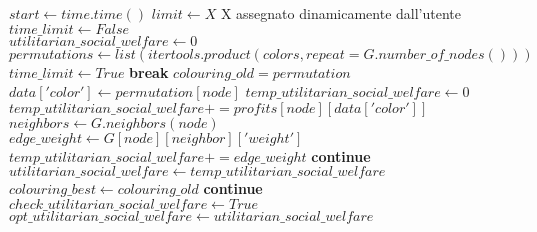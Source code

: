 \newpage
\begin{algorithmic}

\State $start\gets time.time()$
\State $limit\gets X$ \Comment X assegnato dinamicamente dall'utente
\State $time\_limit\gets False$ \\

\State $utilitarian\_social\_welfare\gets 0$
\State $permutations\gets list(itertools.product(colors, repeat=G.number\_of\_nodes()))$ \\

		\State $time\_limit\gets True$ 
		\State \textbf{break}
	\EndIf
	\State $colouring\_old = permutation$
		\State $data['color']\gets permutation[node]$
	\EndFor
	\State $temp\_utilitarian\_social\_welfare\gets 0$
		\State $temp\_utilitarian\_social\_welfare += profits[node][data['color']]$
		\State $neighbors\gets G.neighbors(node)$
				\State $edge\_weight\gets G[node][neighbor]['weight']$
				\State $temp\_utilitarian\_social\_welfare += edge\_weight$
			\Else
				\State \textbf{continue}
			\EndIf
		\EndFor
	\EndFor
		\State $utilitarian\_social\_welfare\gets temp\_utilitarian\_social\_welfare$
		\State $colouring\_best\gets colouring\_old$
	\Else
		\State \textbf{continue}
	\EndIf
\EndFor \\

	\State $check\_utilitarian\_social\_welfare\gets True$
	\State $opt\_utilitarian\_social\_welfare\gets utilitarian\_social\_welfare$
\EndIf 

\end{algorithmic} 

